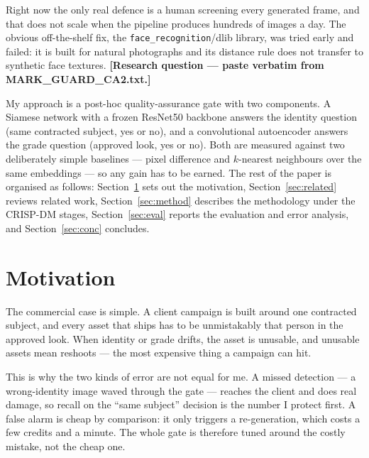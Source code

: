 \documentclass[conference]{IEEEtran}
\begin{document}
Right now the only real defence is a human screening every generated frame, and
that does not scale when the pipeline produces hundreds of images a day. The
obvious off-the-shelf fix, the \texttt{face\_recognition}/dlib library, was
tried early and failed: it is built for natural photographs and its distance
rule does not transfer to synthetic face textures.
\textbf{[Research question --- paste verbatim from MARK\_GUARD\_CA2.txt.]}

My approach is a post-hoc quality-assurance gate with two components. A Siamese
network with a frozen ResNet50 backbone answers the identity question (same
contracted subject, yes or no), and a convolutional autoencoder answers the
grade question (approved look, yes or no). Both are measured against two
deliberately simple baselines --- pixel difference and $k$-nearest neighbours
over the same embeddings --- so any gain has to be earned. The rest of the paper
is organised as follows: Section~\ref{sec:motivation} sets out the motivation,
Section~\ref{sec:related} reviews related work, Section~\ref{sec:method}
describes the methodology under the CRISP-DM stages, Section~\ref{sec:eval}
reports the evaluation and error analysis, and Section~\ref{sec:conc} concludes.

\section{Motivation}
\label{sec:motivation}

The commercial case is simple. A client campaign is built around one contracted
subject, and every asset that ships has to be unmistakably that person in the
approved look. When identity or grade drifts, the asset is unusable, and
unusable assets mean reshoots --- the most expensive thing a campaign can hit.

This is why the two kinds of error are not equal for me. A missed detection ---
a wrong-identity image waved through the gate --- reaches the client and does
real damage, so recall on the ``same subject'' decision is the number I protect
first. A false alarm is cheap by comparison: it only triggers a re-generation,
which costs a few credits and a minute. The whole gate is therefore tuned around
the costly mistake, not the cheap one.
\end{document}
